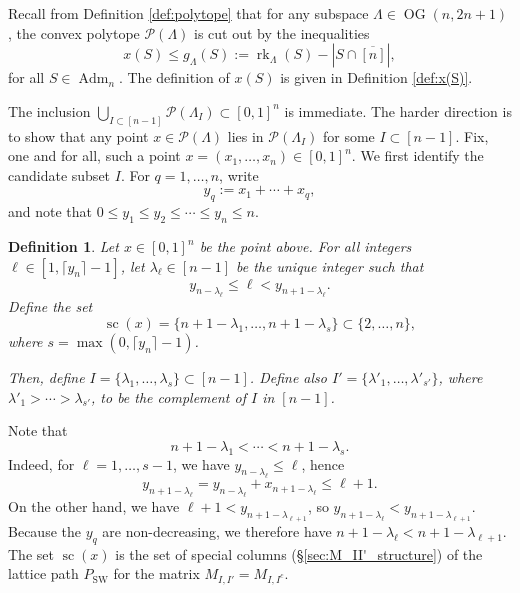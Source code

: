 \documentclass[12pt]{amsart}
\newtheorem{definition}{Definition}[subsection]
\DeclareMathOperator{\Adm}{Adm}
\DeclareMathOperator{\OG}{OG}
\DeclareMathOperator{\SW}{SW}
\DeclareMathOperator{\rk}{rk}
\DeclareMathOperator{\SC}{sc}
\newcommand{\cP}{\mathcal{P}}
\begin{document}
Recall from Definition \ref{def:polytope} that for any subspace $\Lambda\in\OG(n,2n+1)$, the convex polytope $\cP(\Lambda)$ is cut out by the inequalities 
\begin{equation*}
    x(S) \le g_{\Lambda}(S) := \rk_{\Lambda}(S) - |S \cap \overline{[n]}|,
\end{equation*}
for all $S \in \Adm_n$. The definition of $x(S)$ is given in Definition \ref{def:x(S)}.


The inclusion $\bigcup_{I\subset[n-1]}\cP(\Lambda_{I})\subset [0,1]^n$ is immediate. The harder direction is to show that any point $x\in \cP(\Lambda)$ lies in $\cP(\Lambda_I)$ for some $I \subset[n-1]$. Fix, one and for all, such a point $x=(x_1,\ldots,x_n)\in[0,1]^n$. We first identify the candidate subset $I$. For $q=1,\ldots,n$, write
\begin{equation*}
    y_q:=x_1+\cdots+x_q,
\end{equation*}
and note that $0\le y_1\le y_2\le\cdots\le y_n\le n$.

\begin{definition}\label{def:I_associated_to_x}
    Let $x\in[0,1]^n$ be the point above. For all integers $\ell\in[1,\lceil y_n\rceil -1]$, let $\lambda_\ell\in[n-1]$ be the unique integer such that 
    \begin{equation}\label{eq:I'_inequalities}
       y_{n-\lambda_{\ell}}\le\ell< y_{n+1-\lambda_{\ell}}.
    \end{equation}
    Define the set
    \begin{equation*}
        \SC(x)=\{n+1-\lambda_1,\ldots,n+1-\lambda_{s}\}\subset\{2,\ldots,n\},
    \end{equation*}
    where $s=\max(0,\lceil y_n\rceil-1)$.
    
    Then, define $I=\{\lambda_1,\ldots,\lambda_{s}\}\subset[n-1]$. Define also $I'=\{\lambda'_1,\ldots,\lambda'_{s'}\}$, where $\lambda'_1>\cdots>\lambda_{s'}$, to be the complement of $I$ in $[n-1]$.
\end{definition}
Note that
\begin{equation*}
    n+1-\lambda_1<\cdots<n+1-\lambda_{s}.
\end{equation*}
Indeed, for $\ell=1,\ldots,s-1$, we have $y_{n-\lambda_\ell}\le \ell$, hence
\begin{equation*}
    y_{n+1-\lambda_\ell}=y_{n-\lambda_\ell}+x_{n+1-\lambda_\ell}\le \ell+1.
\end{equation*}
On the other hand, we have $\ell+1<y_{n+1-\lambda_{\ell+1}}$, so $y_{n+1-\lambda_\ell}<y_{n+1-\lambda_{\ell+1}}$. Because the $y_q$ are non-decreasing, we therefore have $n+1-\lambda_\ell<n+1-\lambda_{\ell+1}$. The set $\SC(x)$ is the set of special columns (\S\ref{sec:M_II'_structure}) of the lattice path $P_{\SW}$ for the matrix $M_{I,I'}=M_{I,I^c}$.
\end{document}
